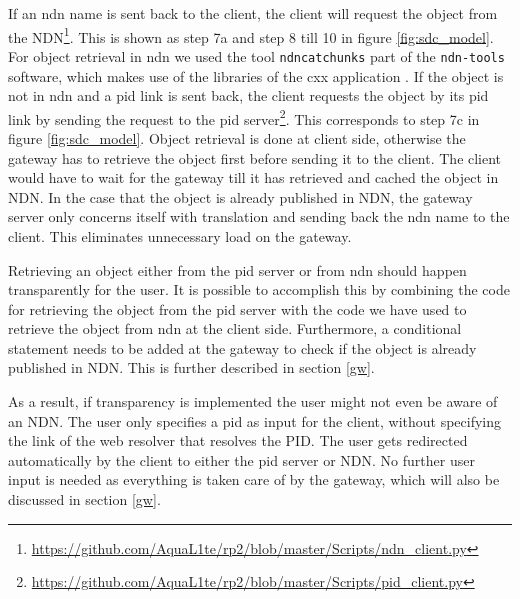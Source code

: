 If an \gls{ndn} name is sent back to the client, the client will request the object from the NDN\footnote{\url{https://github.com/AquaL1te/rp2/blob/master/Scripts/ndn_client.py}}. This is shown as step 7a and step 8 till 10 in figure \ref{fig:sdc_model}. For object retrieval in \gls{ndn} we used the tool \texttt{ndncatchunks} part of the \texttt{ndn-tools} software, which makes use of the libraries of the \gls{cxx} application \cite{ndn-tools}. 
If the object is not in \gls{ndn} and a \gls{pid} link is sent back, the client requests the object by its \gls{pid} link by sending the request to the \gls{pid} server\footnote{\url{https://github.com/AquaL1te/rp2/blob/master/Scripts/pid_client.py}}. This corresponds to step 7c in figure \ref{fig:sdc_model}. Object retrieval is done at client side, otherwise the gateway has to retrieve the object first before sending it to the client. 
The client would have to wait for the gateway till it has retrieved and cached the object in NDN. 
In the case that the object is already published in NDN, the gateway server only concerns itself with translation and sending back the \gls{ndn} name to the client. This eliminates unnecessary load on the gateway.

Retrieving an object either from the \gls{pid} server or from \gls{ndn} should happen transparently for the user. It is possible to accomplish this by combining the code for retrieving the object from the \gls{pid} server with the code we have used to retrieve the object from \gls{ndn} at the client side. Furthermore, a conditional statement needs to be added at the gateway to check if the object is already published in NDN. This is further described in section \ref{gw}.

As a result, if transparency is implemented the user might not even be aware of an NDN. The user only specifies a \gls{pid} as input for the client, without specifying the link of the web resolver that resolves the PID. The user gets redirected automatically by the client to either the \gls{pid} server or NDN. No further user input is needed as everything is taken care of by the gateway, which will also be discussed in section \ref{gw}.

